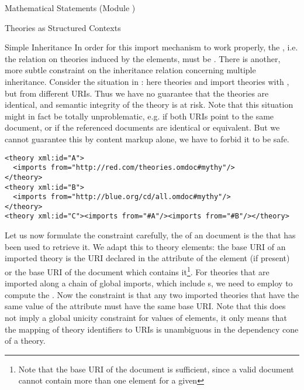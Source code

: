 \begin{tchapter}[id=statements,short=Mathematical Statements]{Mathematical Statements (Module {})}
\begin{tsection}[id=theories]{Theories as Structured Contexts}
\begin{tsubsection}[id=inheritance]{Simple Inheritance}
In order for this import mechanism to work properly, the
{}, i.e.  the relation on theories induced by the
{} elements, must be {}. There is another, more subtle
constraint on the inheritance relation concerning multiple inheritance.  Consider the
situation in {}: here theories {} and
{} import theories with {}, but from different
URIs. Thus we have no guarantee that the theories are identical, and semantic integrity of
the theory {} is at risk. Note that this situation might in fact be totally
unproblematic, e.g. if both URIs point to the same document, or if the referenced
documents are identical or equivalent. But we cannot guarantee this by content markup
alone, we have to forbid it to be safe.

\begin{lstlisting}[label=lst:multiple-inheritance,
  caption={Problematic Multiple Inheritance},
  index={theory,symbol,axiom,imports}]
<theory xml:id="A">
  <imports from="http://red.com/theories.omdoc#mythy"/>
</theory>
<theory xml:id="B">
  <imports from="http://blue.org/cd/all.omdoc#mythy"/>
</theory>
<theory xml:id="C"><imports from="#A"/><imports from="#B"/></theory>
\end{lstlisting}

Let us now formulate the constraint carefully, the {} of an {\xml}
document is the {} that has been used to retrieve it.  We adapt this to
{\omdoc} theory elements: the base URI of an imported theory is the URI declared in the
{} attribute of the {} element (if present) or
the base URI of the document which contains it\footnote{Note that the base URI of the
  document is sufficient, since a valid {\omdoc} document cannot contain more than one
  {} element for a given {}}. For
theories that are imported along a chain of global imports, which include
{s}, we need to employ {} to compute
the {}.  Now the constraint is that any two imported theories that
have the same value of the {} attribute must have the
same base URI. Note that this does not imply a global unicity constraint for
{} values of {} elements, it only means
that the mapping of theory identifiers to URIs is unambiguous in the dependency cone of a
theory.


\end{tsubsection}
\end{tsection}
\end{tchapter}
